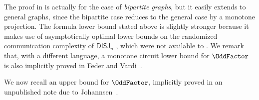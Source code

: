 \documentclass[11pt]{article}
\begin{document}
The proof in \cite{DBLP:journals/combinatorica/BabaiGW99}  is actually for the case of
\emph{bipartite graphs}, but it easily extends to general graphs, since
the bipartite case reduces to the general case by a monotone projection.
The formula lower bound stated above is slightly stronger because it makes
use of asymptotically optimal lower bounds on the randomized communication
complexity of $\mathsf{DISJ}_n$
\citep{DBLP:journals/siamdm/KalyanasundaramS92}, which were not available
to \cite{DBLP:journals/combinatorica/BabaiGW99}. We remark that, with a
different language,
a monotone circuit lower bound for $\OddFactor$ is also implicitly proved
in Feder and
Vardi~\cite[Theorem 30]{DBLP:journals/siamcomp/FederV98}.



We now recall an upper bound for $\OddFactor$,  implicitly proved
in an unpublished note due to Johannsen~\cite{joh03}.
\end{document}
